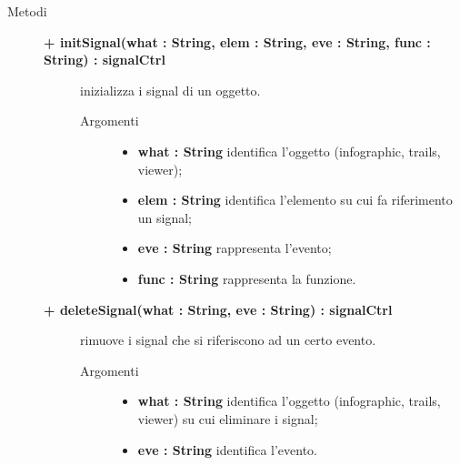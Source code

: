 \begin{description}
	
\item[Metodi] \hfill

	\begin{description}
		\item[\textbf{\color{blue}+ initSignal(what : String, elem : String, eve : String, func : String) : signalCtrl			}] \hfill
			inizializza i signal di un oggetto.
			
		\begin{description}
			\item[Argomenti] \hfill
				\begin{itemize}
				
					\item \textbf{what : String			} \hfill
					identifica l'oggetto (infographic, trails, viewer);
					\item \textbf{elem : String			} \hfill
					identifica l'elemento su cui fa riferimento un signal;
					\item \textbf{eve : String			} \hfill
					rappresenta l'evento;
					\item \textbf{func : String			} \hfill
					rappresenta la funzione.
					
				\end{itemize}
		\end{description}
	\end{description}
	
	\begin{description}
		\item[\textbf{\color{blue}+ deleteSignal(what : String, eve : String) : signalCtrl			}] \hfill
			rimuove i signal che si riferiscono ad un certo evento.
			
		\begin{description}
			\item[Argomenti] \hfill
				\begin{itemize}
				
					\item \textbf{what : String			} \hfill
					identifica l'oggetto (infographic, trails, viewer) su cui eliminare i signal;
					\item \textbf{eve : String			} \hfill
					identifica l'evento.
					
				\end{itemize}
		\end{description}
	\end{description}
	

\end{description}
